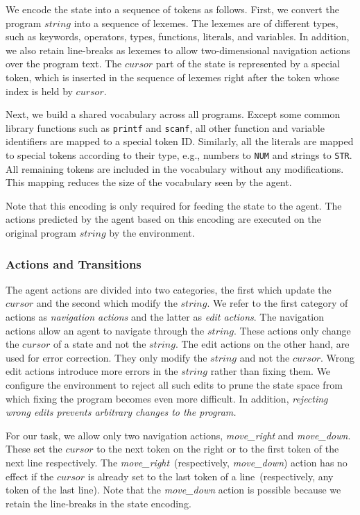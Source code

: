 \documentclass{article}
\begin{document}
We encode the state into a sequence of tokens as follows.
First, we convert the program $ string $ into a sequence of lexemes. 
The lexemes are of different types, such as keywords, operators, types, functions, literals, and variables.
In addition, we also retain line-breaks as lexemes to allow
two-dimensional navigation actions over the program text.
The $ cursor $ part of the state is represented by a special token, which is inserted in the sequence of lexemes right after the token whose index is held by $ cursor $.

Next, we build a shared vocabulary across all programs.
Except some common library functions such as \texttt{printf} and \texttt{scanf}, 
all other function and variable identifiers are mapped to a special token ID. 
Similarly, all the literals are mapped to special tokens according to their type, e.g., numbers to \texttt{NUM} and strings to \texttt{STR}.
All remaining tokens are included in the vocabulary without any modifications.
This mapping reduces the size of the vocabulary seen by the agent.

Note that this encoding is only required for feeding the state to the agent.
The actions predicted by the agent based on this encoding are executed on the original program $ string $ by the environment.
	
\subsubsection{Actions and Transitions}
The agent actions are divided into two categories, the first which update the $ cursor $ and the second which modify the $ string $.
We refer to the first category of actions as \emph{navigation actions} and the latter as \emph{edit actions}. 
The navigation actions allow an agent to navigate through the $ string $. These actions only change the $ cursor $ of a state and not the $ string $.
The edit actions on the other hand, are used for error correction.
They only modify the $ string $ and not the $ cursor $.
Wrong edit actions introduce more errors in the $ string $ rather than fixing them.
We configure the environment to reject all such edits to prune the state space from which fixing the program becomes even more difficult.
In addition, \emph{rejecting wrong edits prevents arbitrary changes to the program.}

For our task, we allow only two navigation actions, \emph{move\_right} and \emph{move\_down}.
These set the $ cursor $ to the next token on the right or to the first token of the next line respectively.
The \emph{move\_right}~(respectively, \emph{move\_down}) action has no effect if the $ cursor $ is already set to the last token of a line~(respectively, any token of the last line).
Note that the \emph{move\_down} action is possible because we retain the line-breaks in the state encoding.
\end{document}
